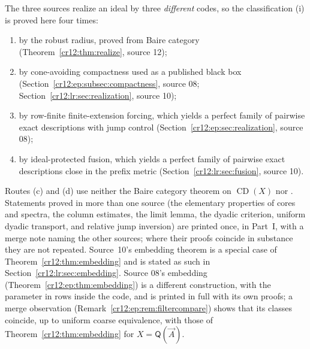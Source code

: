 \documentclass[11pt,letterpaper]{article}
\theoremstyle{plain}
\theoremstyle{definition}
\theoremstyle{remark}
\numberwithin{equation}{section}
\newcommand{\CD}{\operatorname{CD}}
\newcommand{\QQ}{\mathsf Q}              %
\begin{document}
The three sources realize an ideal by three \emph{different} codes, so the
classification (i) is proved here four times:
\begin{enumerate}[label=(\alph*)]
\item by the robust radius, proved from Baire category
 (Theorem~\ref{cr12:thm:realize}, source 12);
\item by cone-avoiding compactness \cite[Theorem~3.7]{HJKS} used as a published
 black box (Section~\ref{cr12:ep:subsec:compactness}, source 08;
 Section~\ref{cr12:lr:sec:realization}, source 10);
\item by row-finite finite-extension forcing, which yields a perfect family of
 pairwise exact descriptions with jump control (Section~\ref{cr12:ep:sec:realization},
 source 08);
\item by ideal-protected fusion, which yields a perfect family of pairwise exact
 descriptions close in the prefix metric (Section~\ref{cr12:lr:sec:fusion}, source 10).
\end{enumerate}
Routes (c) and (d) use neither the Baire category theorem on $\CD(X)$ nor
\cite[Theorem~3.7]{HJKS}. Statements proved in more than one source (the
elementary properties of cores and spectra, the column estimates, the limit
lemma, the dyadic criterion, uniform dyadic transport, and relative jump
inversion) are printed once, in Part~I, with a merge note naming the other
sources; where their proofs coincide in substance they are not repeated.
Source~10's embedding theorem is a special case of
Theorem~\ref{cr12:thm:embedding} and is stated as such in
Section~\ref{cr12:lr:sec:embedding}. Source 08's embedding
(Theorem~\ref{cr12:ep:thm:embedding}) is a different construction, with the parameter
in rows inside the code, and is printed in full with its own proofs; a merge
observation (Remark~\ref{cr12:ep:rem:filtercompare}) shows that its classes coincide,
up to uniform coarse equivalence, with those of Theorem~\ref{cr12:thm:embedding} for
$X=\QQ(\vec A)$.
\end{document}
